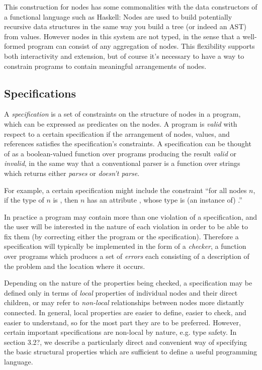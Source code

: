 This construction for nodes has some commonalities with the data constructors of a functional language such as Haskell: Nodes are used to build potentially recursive data structures in the same way you build a tree (or indeed an AST) from values. However nodes in this system are not typed, in the sense that a well-formed program can consist of any aggregation of nodes. This flexibility supports both interactivity and extension, but of course it's necessary to have a way to constrain programs to contain meaningful arrangements of nodes.


\subsection{Specifications}
A \emph{specification} is a set of constraints on the structure of nodes in a program, which can be expressed as predicates on the nodes. A program is \emph{valid} with respect to a certain specification if the arrangement of nodes, values, and references satisfies the specification's constraints. A specification can be thought of as a boolean-valued function over programs producing the result \emph{valid} or \emph{invalid}, in the same way that a conventional parser is a function over strings which returns either \emph{parses} or \emph {doesn't parse}.

For example, a certain specification might include the constraint ``for all nodes $n$, if the type of $n$ is , then $n$ has an attribute , whose type is (an instance of) .''

In practice a program may contain more than one violation of a specification, and the user will be interested in the nature of each violation in order to be able to fix them (by correcting either the program or the specification). Therefore a specification will typically be implemented in the form of a \emph{checker}, a function over programs which produces a set of \emph{errors} each consisting of a description of the problem and the location where it occurs.

Depending on the nature of the properties being checked, a specification may be defined only in terms of \emph{local} properties of individual nodes and their direct children, or may refer to \emph{non-local} relationships between nodes more distantly connected. In general, local properties are easier to define, easier to check, and easier to understand, so for the most part they are to be preferred. However, certain important specifications are non-local by nature, e.g. type safety. In section 3.2?\todo{}, we describe a particularly direct and convenient way of specifying the basic structural properties which are sufficient to define a useful programming language.

